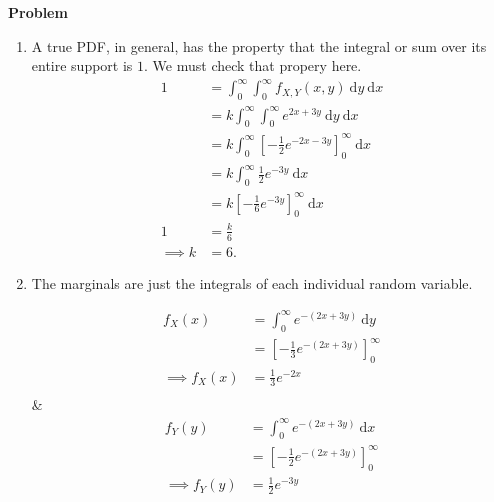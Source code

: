 \documentclass[12pt]{article}
\newenvironment{Ex}{\textbf{Problem}\vspace{.75em}\\}{}
\newcommand{\dd}[1]{\:\mathrm{d}{#1}}
\begin{document}
\begin{enumerate}
\begin{Ex}
\begin{solution}
        \begin{enumerate}
        \item A true PDF, in general, has the property that the
          integral or sum over its entire support is $1$. We must
          check that propery here.
          \begin{equation}
            \label{eq:6a-sol}
            \begin{aligned}
              1 &= \int_0^\infty \int_0^\infty f_{X,Y}(x,y) \dd{y}
              \dd{x} \\
              &= k \int_0^\infty \int_0^\infty e^{2x+3y} \dd{y}
              \dd{x} \\
              &= k \int_0^\infty
              \left[-\frac{1}{2}e^{-2x-3y}\right]_0^\infty
              \dd{x} \\
              &= k \int_0^\infty \frac{1}{2}e^{-3y} \dd{x} \\
              &= k \left[-\frac{1}{6}e^{-3y}\right]_0^\infty \dd{x} \\
              1 &= \frac{k}{6} \\
              \implies k &= 6.
            \end{aligned}
          \end{equation}
        \item The marginals are just the integrals of each individual
          random variable.
          \begin{multicols}{2}
            \begin{equation}
              \label{eq:5b-marginal-x}
              \begin{aligned}
                f_X(x) &= \int_0^\infty e^{-(2x+3y)} \dd{y} \\
                &= \left[-\frac{1}{3}e^{-(2x+3y)}\right]_0^\infty \\
                \implies f_X(x) &= \frac{1}{3}e^{-2x} \\
              \end{aligned}
            \end{equation} &
            \begin{equation}
              \label{eq:5b-marginal-y}
              \begin{aligned}
                f_Y(y) &= \int_0^\infty e^{-(2x+3y)} \dd{x} \\
                &= \left[-\frac{1}{2}e^{-(2x+3y)}\right]_0^\infty \\
                \implies f_Y(y) &= \frac{1}{2}e^{-3y} \\

\end{aligned}
\end{equation}
\end{multicols}
\end{enumerate}
\end{solution}
\end{Ex}
\end{enumerate}
\end{document}
